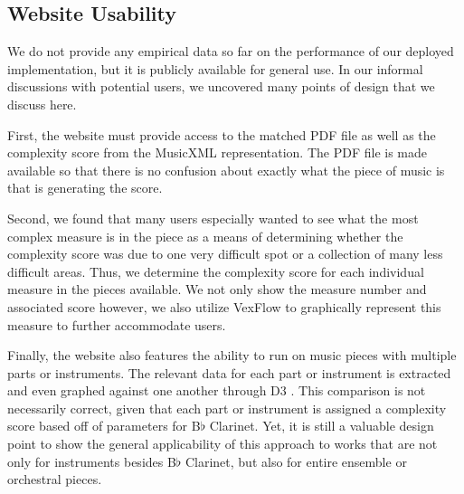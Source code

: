 \documentclass[10pt,preprint]{sigplanconf}
\begin{document}

\subsection{Website Usability} 
\label{sec:usability}

We do not provide any empirical data so far on the performance of our deployed implementation, but it is publicly available for general use. In our informal discussions with potential users, we uncovered many points of design that we discuss here.

First, the website must provide access to the matched PDF file as well as the complexity score from the MusicXML representation. The PDF file is made available so that there is no confusion about exactly what the piece of music is that is generating the score.

Second, we found that many users especially wanted to see what the most complex measure is in the piece as a means of determining whether the complexity score was due to one very difficult spot or a collection of many less difficult areas. Thus, we determine the complexity score for each individual measure in the pieces available. We not only show the measure number and associated score however, we also utilize VexFlow \cite{VexFlow} to graphically represent this measure to further accommodate users.

Finally, the website also features the ability to run on music pieces with multiple parts or instruments. The relevant data for each part or instrument is extracted and even graphed against one another through D3 \cite{D3}. This comparison is not necessarily correct, given that each part or instrument is assigned a complexity score based off of parameters for B$\flat$ Clarinet. Yet, it is still a valuable design point to show the general applicability of this approach to works that are not only for instruments besides B$\flat$ Clarinet, but also for entire ensemble or orchestral pieces.
\end{document}
